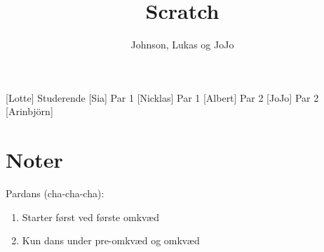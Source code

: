 \documentclass[a4paper,11pt]{article}
\title{Scratch}
\author{Johnson, Lukas og JoJo}
\begin{document}
\maketitle

\begin{roles}
[Lotte] Studerende
[Sia] Par 1
[Nicklas] Par 1
[Albert] Par 2
[JoJo] Par 2
[Arinbjörn]

\end{roles} 

\section*{Noter}
Pardans (cha-cha-cha): 
\begin{enumerate}
    \item Starter først ved første omkvæd
    \item Kun dans under pre-omkvæd og omkvæd
\end{enumerate}

\begin{props}
\prop{}
\prop{}
\prop{}
\prop{}
\prop{}
\prop{}
\end{props}
\end{document}
